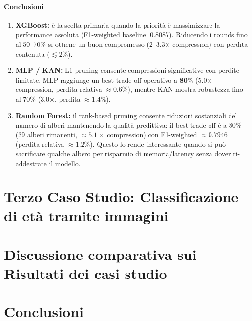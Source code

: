 \documentclass[a4paper,12pt]{report}
\begin{document}
	\subsubsection{Conclusioni}
	\begin{enumerate}
		\item \textbf{XGBoost:} è la scelta primaria quando la priorità è massimizzare la performance assoluta (F1-weighted baseline: 0.8087). Riducendo i rounds fino al \(50\text{--}70\%\) si ottiene un buon compromesso (2--3.3\(\times\) compression) con perdita contenuta (\(\lesssim 2\%\)).
		\item \textbf{MLP / KAN:} L1 pruning consente compressioni significative con perdite limitate. MLP raggiunge un best trade-off operativo a \(\mathbf{80\%}\) (5.0\(\times\) compression, perdita relativa \(\approx 0.6\%\)), mentre KAN mostra robustezza fino al \(70\%\) (3.0\(\times\), perdita \(\approx 1.4\%\)).
		\item \textbf{Random Forest:} il rank-based pruning consente riduzioni sostanziali del numero di alberi mantenendo la qualità predittiva: il best trade-off è a \(80\%\) (39 alberi rimanenti, \(\approx 5.1\times\) compression) con F1-weighted \(\approx 0.7946\) (perdita relativa \(\approx 1.2\%\)). Questo lo rende interessante quando si può sacrificare qualche albero per risparmio di memoria/latency senza dover ri-addestrare il modello.
	\end{enumerate}
	
	\chapter{Terzo Caso Studio: Classificazione di età tramite immagini}
	
	
	
	\chapter{Discussione comparativa sui Risultati dei casi studio}
	
	\chapter{Conclusioni}
	
\end{document}
